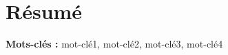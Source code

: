 
\chapter*{Résumé}

\lipsum[1]

\vspace{0.5cm}
\noindent\textbf{Mots-clés :} mot-clé1, mot-clé2, mot-clé3, mot-clé4
